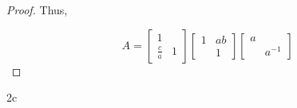\documentclass{article}
\begin{document}
\begin{proof}
    Thus, 

    \begin{equation*}
        A = \begin{bmatrix}
            1 \\ \frac{c}{a} & 1
        \end{bmatrix} \begin{bmatrix}
            1 & ab \\ & 1
        \end{bmatrix} \begin{bmatrix}
            a \\ & a^{-1}
        \end{bmatrix}
    \end{equation*} 
\end{proof}

\begin{PROB}{2c}\label{Problem 2c.}
\end{PROB}
\end{document}
